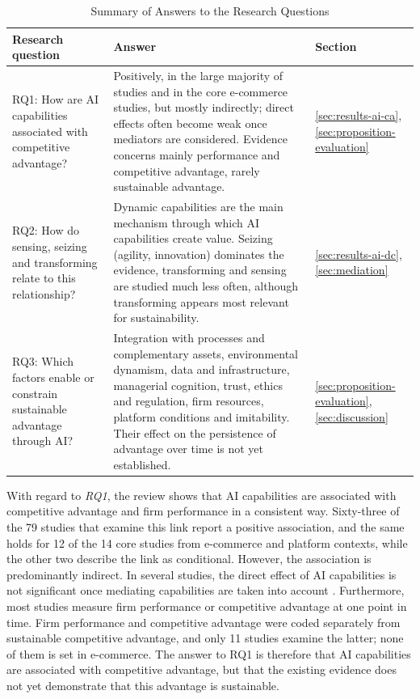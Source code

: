 \begin{table}[H]
  \centering
  \caption{Summary of Answers to the Research Questions}
  \label{tab:rq-answers}
  \small{}\sloppy
  \begin{tabularx}{\textwidth}{>{\raggedright\arraybackslash}p{3.4cm}>{\raggedright\arraybackslash}X>{\raggedright\arraybackslash}p{1.8cm}}
    \toprule
    \textbf{Research question} & \textbf{Answer} & \textbf{Section} \\
    \midrule
    RQ1: How are AI capabilities associated with competitive advantage? & Positively, in the large majority of studies and in the core e-commerce studies, but mostly indirectly; direct effects often become weak once mediators are considered. Evidence concerns mainly performance and competitive advantage, rarely sustainable advantage. & \ref{sec:results-ai-ca}, \ref{sec:proposition-evaluation} \\
    \addlinespace
    RQ2: How do sensing, seizing and transforming relate to this relationship? & Dynamic capabilities are the main mechanism through which AI capabilities create value. Seizing (agility, innovation) dominates the evidence, transforming and sensing are studied much less often, although transforming appears most relevant for sustainability. & \ref{sec:results-ai-dc}, \ref{sec:mediation} \\
    \addlinespace
    RQ3: Which factors enable or constrain sustainable advantage through AI? & Integration with processes and complementary assets, environmental dynamism, data and infrastructure, managerial cognition, trust, ethics and regulation, firm resources, platform conditions and imitability. Their effect on the persistence of advantage over time is not yet established. & \ref{sec:proposition-evaluation}, \ref{sec:discussion} \\
    \bottomrule
  \end{tabularx}
\end{table}

With regard to \emph{RQ1}, the review shows that AI capabilities are associated with competitive advantage and firm performance in a consistent way. Sixty-three of the 79 studies that examine this link report a positive association, and the same holds for 12 of the 14 core studies from e-commerce and platform contexts, while the other two describe the link as conditional. However, the association is predominantly indirect. In several studies, the direct effect of AI capabilities is not significant once mediating capabilities are taken into account . Furthermore, most studies measure firm performance or competitive advantage at one point in time. Firm performance and competitive advantage were coded separately from sustainable competitive advantage, and only 11 studies examine the latter; none of them is set in e-commerce. The answer to RQ1 is therefore that AI capabilities are associated with competitive advantage, but that the existing evidence does not yet demonstrate that this advantage is sustainable.

